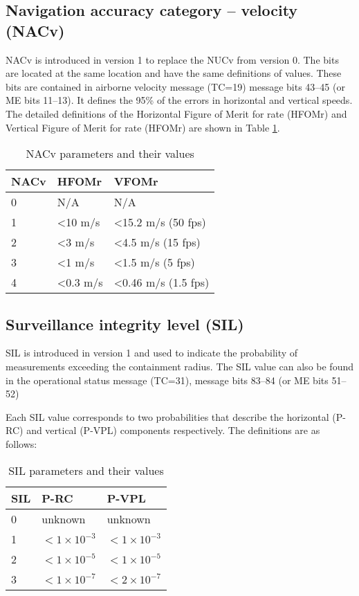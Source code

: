 \subsection{Navigation accuracy category -- velocity (NACv)}

NACv is introduced in version 1 to replace the NUCv from version 0. The bits are located at the same location and have the same definitions of values. These bits are contained in airborne velocity message (TC=19) message bits 43--45 (or ME bits 11--13). It defines the 95\% of the errors in horizontal and vertical speeds. The detailed definitions of the Horizontal Figure of Merit for rate (HFOMr) and Vertical Figure of Merit for rate (HFOMr) are shown in Table \ref{tb:nacv-params}.

\begin{table}[!ht]
\caption{NACv parameters and their values}
\label{tb:nacv-params}
\begin{tabular}{|l|l|l|}
\hline
\textbf{NACv} & \textbf{HFOMr} & \textbf{VFOMr} \\ \hline
0 & N/A & N/A \\ \hline
1 & \textless 10 m/s & \textless 15.2 m/s (50 fps) \\ \hline
2 & \textless 3 m/s & \textless 4.5 m/s (15 fps) \\ \hline
3 & \textless 1 m/s & \textless 1.5 m/s (5 fps) \\ \hline
4 & \textless 0.3 m/s & \textless 0.46 m/s (1.5 fps) \\ \hline
\end{tabular}
\end{table}


\subsection{Surveillance integrity level (SIL)}

SIL is introduced in version 1 and used to indicate the probability of measurements exceeding the containment radius. The SIL value can also be found in the operational status message (TC=31), message bits 83--84 (or ME bits 51--52)

Each SIL value corresponds to two probabilities that describe the horizontal (P-RC) and vertical (P-VPL) components respectively. The definitions are as follows:

\begin{table}[!ht]
\caption{SIL parameters and their values}
\label{tb:sil-params}
\begin{tabular}{|l|l|l|}
\hline
SIL & P-RC & P-VPL \\ \hline
0 & unknown & unknown \\ \hline
1 & $< 1 \times 10^{-3}$ & $< 1 \times 10^{-3}$ \\ \hline
2 & $< 1 \times 10^{-5}$ & $< 1 \times 10^{-5}$ \\ \hline
3 & $< 1 \times 10^{-7}$ & $< 2 \times 10^{-7}$ \\ \hline
\end{tabular}
\end{table}

